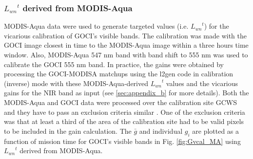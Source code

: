 \documentclass[10pt]{article}
\begin{document}
\subsubsection{${L_{wn}}^t$ derived from MODIS-Aqua}
MODIS-Aqua data were used to generate targeted values (i.e. ${L_{wn}}^t$) for the vicarious calibration of GOCI's visible bands.
The calibration was made with the GOCI image closest in time to the MODIS-Aqua image within a three hours time window.
Also, MODIS-Aqua 547 nm band with band shift to 555 nm was used to calibrate the GOCI 555 nm band.
In practice, the gains were obtained by processing the GOCI-MODISA matchups using the l2gen code in calibration (inverse) mode with these MODIS-Aqua-derived ${L_{wn}}^t$ values and the vicarious gains for the NIR band as input (see \autoref{sec:appendix_b} for more details).
Both the MODIS-Aqua and GOCI data were processed over the calibration site GCWS and they have to pass an exclusion criteria similar \cite{Bailey2006}.
One of the exclusion criteria was that at least a third of the area of the calibration site had to be valid pixels to be included in the gain calculation.
The $\bar{g}$ and individual $g_i$ are plotted as a function of mission time for GOCI's visible bands in Fig. \ref{fig:Gvcal_MA} using ${L_{wn}}^t$ derived from MODIS-Aqua. 

\end{document}
